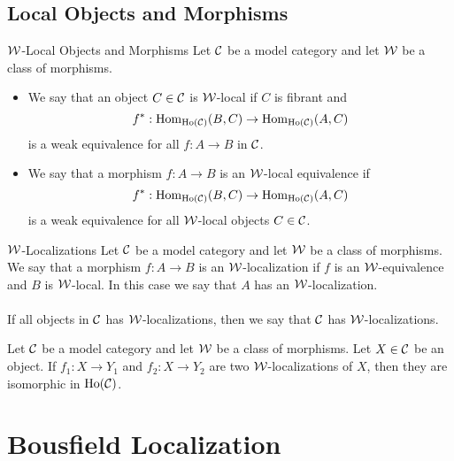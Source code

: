 \documentclass[a4paper]{article}
\begin{document}
\subsection{Local Objects and Morphisms}
\begin{defn}{$\mathcal{W}$-Local Objects and Morphisms}{} Let $\mathcal{C}$ be a model category and let $\mathcal{W}$ be a class of morphisms. 
\begin{itemize}
\item We say that an object $C\in\mathcal{C}$ is $\mathcal{W}$-local if $C$ is fibrant and $$f^\ast:\operatorname{Hom}_{\text{Ho}(\mathcal{C})}(B,C)\to\operatorname{Hom}_{\text{Ho}(\mathcal{C})}(A,C)$$ is a weak equivalence for all $f:A\to B$ in $\mathcal{C}$. 
\item We say that a morphism $f:A\to B$ is an $\mathcal{W}$-local equivalence if $$f^\ast:\operatorname{Hom}_{\text{Ho}(\mathcal{C})}(B,C)\to\operatorname{Hom}_{\text{Ho}(\mathcal{C})}(A,C)$$ is a weak equivalence for all $\mathcal{W}$-local objects $C\in\mathcal{C}$. 
\end{itemize}
\end{defn}

\begin{defn}{$\mathcal{W}$-Localizations}{} Let $\mathcal{C}$ be a model category and let $\mathcal{W}$ be a class of morphisms. We say that a morphism $f:A\to B$ is an $\mathcal{W}$-localization if $f$ is an $\mathcal{W}$-equivalence and $B$ is $\mathcal{W}$-local. In this case we say that $A$ has an $\mathcal{W}$-localization. \\~\\

If all objects in $\mathcal{C}$ has $\mathcal{W}$-localizations, then we say that $\mathcal{C}$ has $\mathcal{W}$-localizations. 
\end{defn}

\begin{prp}{}{} Let $\mathcal{C}$ be a model category and let $\mathcal{W}$ be a class of morphisms. Let $X\in\mathcal{C}$ be an object. If $f_1:X\to Y_1$ and $f_2:X\to Y_2$ are two $\mathcal{W}$-localizations of $X$, then they are isomorphic in $\text{Ho}(\mathcal{C})$. 
\end{prp}

\pagebreak
\section{Bousfield Localization}
\end{document}
